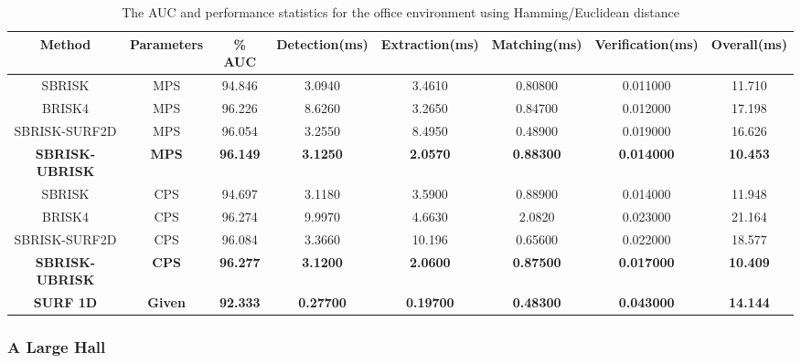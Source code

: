 \documentclass{article}
\begin{document}
\begin{table}


\caption{The AUC and performance statistics for the office environment using
Hamming/Euclidean distance}

\footnotesize
\begin{tabular}{|c|c|c|c|c|c|c|c|}
\hline 
\textbf{Method} & \textbf{Parameters} & \textbf{\% AUC} & \textbf{Detection(ms)} & \textbf{Extraction(ms)} & \textbf{Matching(ms)} & \textbf{Verification(ms)} & \textbf{Overall(ms)}\tabularnewline
\hline 
\hline 
SBRISK & MPS & 94.846 & 3.0940 & 3.4610 & 0.80800 & 0.011000 & 11.710\tabularnewline
\hline 
BRISK4 & MPS & 96.226 & 8.6260 & 3.2650 & 0.84700 & 0.012000 & 17.198\tabularnewline
\hline 
SBRISK-SURF2D & MPS & 96.054 & 3.2550 & 8.4950 & 0.48900 & 0.019000 & 16.626\tabularnewline
\hline 
\textbf{SBRISK-UBRISK} & \textbf{MPS} & \textbf{96.149} & \textbf{3.1250} & \textbf{2.0570} & \textbf{0.88300} & \textbf{0.014000} & \textbf{10.453}\tabularnewline
\hline 
SBRISK & CPS & 94.697 & 3.1180 & 3.5900 & 0.88900 & 0.014000 & 11.948\tabularnewline
\hline 
BRISK4 & CPS & 96.274 & 9.9970 & 4.6630 & 2.0820 & 0.023000 & 21.164\tabularnewline
\hline 
SBRISK-SURF2D & CPS & 96.084 & 3.3660 & 10.196 & 0.65600 & 0.022000 & 18.577\tabularnewline
\hline 
\textbf{SBRISK-UBRISK} & \textbf{CPS} & \textbf{96.277} & \textbf{3.1200} & \textbf{2.0600} & \textbf{0.87500} & \textbf{0.017000} & \textbf{10.409}\tabularnewline
\hline 
\textbf{SURF 1D} & \textbf{Given} & \textbf{92.333} & \textbf{0.27700} & \textbf{0.19700} & \textbf{0.48300} & \textbf{0.043000} & \textbf{14.144}\tabularnewline
\hline 
\end{tabular}
\end{table}



\subsubsection{A Large Hall}
\label{sec:largeHall}
\end{document}
